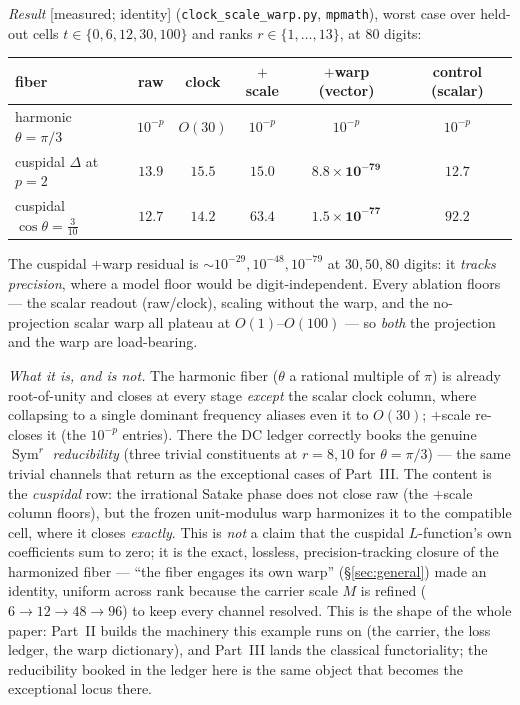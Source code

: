 \documentclass[11pt]{article}
\theoremstyle{definition}
\newcommand{\Sym}{\operatorname{Sym}}
\begin{document}
\emph{Result} \textup{[measured; identity]} (\texttt{clock\_scale\_warp.py}, \texttt{mpmath}), worst case over
held-out cells $t\in\{0,6,12,30,100\}$ and ranks $r\in\{1,\dots,13\}$, at $80$ digits:
\begin{center}
\footnotesize
\setlength{\tabcolsep}{4pt}%
\begin{tabular}{lccccc}
\toprule
fiber & raw & clock & $+$scale & $+$warp (vector) & control (scalar) \\
\midrule
harmonic $\theta=\pi/3$ & $10^{-p}$ & $O(30)$ & $10^{-p}$ & $10^{-p}$ & $10^{-p}$ \\
cuspidal $\Delta$ at $p{=}2$ & $13.9$ & $15.5$ & $15.0$ & $\mathbf{8.8\times10^{-79}}$ & $12.7$ \\
cuspidal $\cos\theta=\tfrac{3}{10}$ & $12.7$ & $14.2$ & $63.4$ & $\mathbf{1.5\times10^{-77}}$ & $92.2$ \\
\bottomrule
\end{tabular}
\end{center}
The cuspidal $+$warp residual is $\sim10^{-29},10^{-48},10^{-79}$ at $30,50,80$ digits: it \emph{tracks
precision}, where a model floor would be digit-independent. Every ablation floors --- the scalar readout
(raw/clock), scaling without the warp, and the no-projection scalar warp all plateau at $O(1)$--$O(100)$ --- so
\emph{both} the projection and the warp are load-bearing.

\emph{What it is, and is not.} The harmonic fiber ($\theta$ a rational multiple of $\pi$) is already
root-of-unity and closes at every stage \emph{except} the scalar clock column, where collapsing to a single
dominant frequency aliases even it to $O(30)$; $+$scale re-closes it (the $10^{-p}$ entries). There the DC ledger
correctly books the genuine $\Sym^r$
\emph{reducibility} (three trivial constituents at $r=8,10$ for $\theta=\pi/3$) --- the same trivial channels
that return as the exceptional cases of Part~III. The content is the \emph{cuspidal} row: the irrational Satake
phase does not close raw (the $+$scale column floors), but the frozen unit-modulus warp harmonizes it to the
compatible cell, where it closes \emph{exactly}. This is \emph{not} a claim that the cuspidal $L$-function's own
coefficients sum to zero; it is the exact, lossless, precision-tracking closure of the harmonized fiber ---
``the fiber engages its own warp'' (\S\ref{sec:general}) made an identity, uniform across rank because the
carrier scale $M$ is refined ($6\to12\to48\to96$) to keep every channel resolved. This is the shape of the
whole paper: Part~II builds the machinery this example runs on (the carrier, the loss ledger, the warp
dictionary), and Part~III lands the classical functoriality; the reducibility booked in the ledger here is the
same object that becomes the exceptional locus there.
\end{document}
